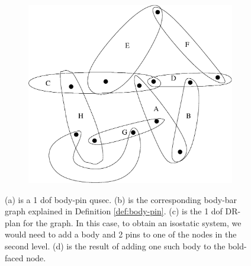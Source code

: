 \begin{figure}
\begin{subfigure}{0.3\linewidth}
    \caption{}
\end{subfigure}
\begin{subfigure}{0.2\linewidth}\centering
    \includegraphics[width=\linewidth]{img/bodypin2}
    \caption{}
\end{subfigure}

    
\caption{(a) is a 1 dof body-pin qusec. (b) is the corresponding body-bar graph explained in Definition \ref{def:body-pin}. (c) is the 1 dof DR-plan for the graph. In this case, to obtain an isostatic system, we would need to add a body and 2 pins to one of the nodes in the second level. (d) is the result of adding one such body to the bold-faced node.}

\end{figure}

